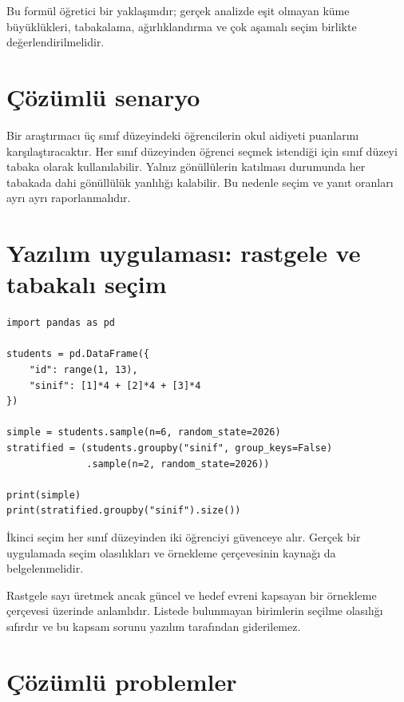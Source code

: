 Bu formül öğretici bir yaklaşımdır; gerçek analizde eşit olmayan küme
büyüklükleri, tabakalama, ağırlıklandırma ve çok aşamalı seçim birlikte
değerlendirilmelidir.



\section{Çözümlü senaryo}

Bir araştırmacı üç sınıf düzeyindeki öğrencilerin okul aidiyeti puanlarını
karşılaştıracaktır. Her sınıf düzeyinden öğrenci seçmek istendiği için sınıf
düzeyi tabaka olarak kullanılabilir. Yalnız gönüllülerin katılması durumunda
her tabakada dahi gönüllülük yanlılığı kalabilir. Bu nedenle seçim ve yanıt
oranları ayrı ayrı raporlanmalıdır.

\section{Yazılım uygulaması: rastgele ve tabakalı seçim}

\begin{softwarebox}
\begin{lstlisting}
import pandas as pd

students = pd.DataFrame({
    "id": range(1, 13),
    "sinif": [1]*4 + [2]*4 + [3]*4
})

simple = students.sample(n=6, random_state=2026)
stratified = (students.groupby("sinif", group_keys=False)
              .sample(n=2, random_state=2026))

print(simple)
print(stratified.groupby("sinif").size())
\end{lstlisting}
İkinci seçim her sınıf düzeyinden iki öğrenciyi güvenceye alır. Gerçek bir
uygulamada seçim olasılıkları ve örnekleme çerçevesinin kaynağı da
belgelenmelidir.
\end{softwarebox}

\begin{assumptionbox}
Rastgele sayı üretmek ancak güncel ve hedef evreni kapsayan bir örnekleme
çerçevesi üzerinde anlamlıdır. Listede bulunmayan birimlerin seçilme
olasılığı sıfırdır ve bu kapsam sorunu yazılım tarafından giderilemez.
\end{assumptionbox}

\section{Çözümlü problemler}

